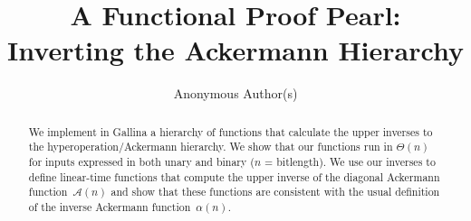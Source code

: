 \documentclass[runningheads]{llncs}
\title{A Functional Proof Pearl: \protect\\ Inverting the Ackermann Hierarchy}
\newcommand{\Ack}{\ensuremath{\mathcal{A}}}
\begin{document}
\author{Anonymous Author(s)}

%


\maketitle








\begin{abstract}
\vspace{-2em}
We implement in Gallina a hierarchy of functions that calculate 
the upper inverses to the hyperoperation/Ackermann hierarchy.
We show that our functions run in $\Theta(n)$ for inputs expressed 
in both unary and binary ($n$ = bitlength). We use our inverses
to define linear-time functions that compute the upper inverse of the diagonal 
Ackermann \linebreak[3] function~$\Ack(n)$ and show that these functions are consistent with the usual definition of the inverse 
Ackermann function~$\alpha(n)$.
\end{abstract}
\end{document}
